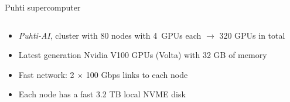 \documentclass[aspectratio=1610,14pt]{beamer}
\newcommand{\vitem}{\vfill\item}
\begin{document}
\begin{frame}{Puhti supercomputer}
  \begin{columns}
    \begin{column}{0.76\linewidth}
      \begin{minipage}[c][0.6\textheight][s]{\columnwidth}
      \begin{itemize}
        \item \emph{Puhti-AI}, cluster with 80 nodes with \mbox{4 GPUs}
        each $\rightarrow$ 320 GPUs in total
        \vitem Latest generation Nvidia V100 GPUs (Volta) with 32 GB of memory
        \vitem Fast network: 2 $\times$ 100 Gbps links to each node
        \vitem Each node has a fast 3.2 TB local NVME disk
      \end{itemize}
      \vfill
      \end{minipage}
    \end{column}
    \begin{column}{0.24\linewidth}

\end{column}
\end{columns}
\end{frame}
\end{document}
